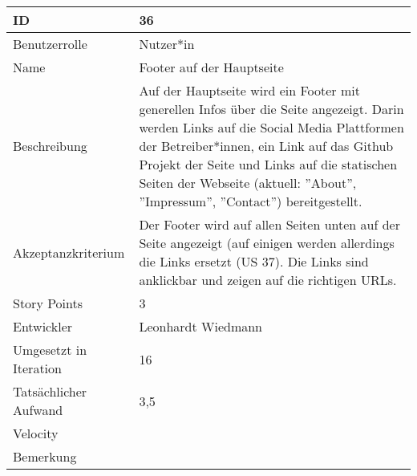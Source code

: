 \begin{tabularx}{\textwidth}{|p{}|X|}
	\hline
	ID & 36\\
	\hline
	Benutzerrolle & Nutzer*in\\
	\hline
	Name & Footer auf der Hauptseite\\
	\hline
	Beschreibung & Auf der Hauptseite wird ein Footer mit generellen Infos über die Seite angezeigt. Darin werden Links auf die Social Media Plattformen der Betreiber*innen, ein Link auf das Github Projekt der Seite und Links auf die statischen Seiten der Webseite (aktuell: ''About'', ''Impressum'', ''Contact'') bereitgestellt.\\
	\hline
	Akzeptanzkriterium & Der Footer wird auf allen Seiten unten auf der Seite angezeigt (auf einigen werden allerdings die Links ersetzt (US 37). Die Links sind anklickbar und zeigen auf die richtigen URLs.\\
	\hline
	Story Points & 3\\
	\hline
	Entwickler & Leonhardt Wiedmann\\
	\hline
	Umgesetzt in Iteration & 16\\
	\hline
	Tatsächlicher Aufwand & 3,5\\
	\hline
	Velocity & \\
	\hline
	Bemerkung & \\
	\hline
\end{tabularx}
\vspace{20pt}
